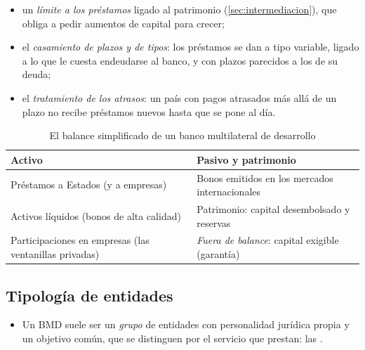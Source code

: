 \documentclass[11pt]{article}
\begin{document}
\begin{itemize}
  \begin{itemize}
  \item un \emph{límite a los préstamos} ligado al patrimonio (\ref{sec:intermediacion}), que obliga a pedir aumentos de capital para crecer;
  \item el \emph{casamiento de plazos y de tipos}: los préstamos se dan a tipo variable, ligado a lo que le cuesta endeudarse al banco, y con plazos parecidos a los de su deuda;
  \item el \emph{tratamiento de los atrasos}: un país con pagos atrasados más allá de un plazo no recibe préstamos nuevos hasta que se pone al día.
  \end{itemize}
\end{itemize}

\begin{table}[H]
\centering
\caption{El balance simplificado de un banco multilateral de desarrollo}\label{tab:balance}
\small
\begin{tabular}{>{\raggedright\arraybackslash}m{6.6cm}>{\raggedright\arraybackslash}m{6.6cm}}
\toprule
\rowcolor{tceeazulpalido} Activo & Pasivo y patrimonio \\
\midrule
Préstamos a Estados (y a empresas) & Bonos emitidos en los mercados internacionales \\
Activos líquidos (bonos de alta calidad) & Patrimonio: capital desembolsado y reservas \\
Participaciones en empresas (las ventanillas privadas) & \emph{Fuera de balance}: capital exigible (garantía) \\
\bottomrule
\end{tabular}
\end{table}

\subsection{Tipología de entidades}\label{sec:tipologia}

\begin{itemize}
\item Un BMD suele ser un \emph{grupo} de entidades con personalidad jurídica propia y un objetivo común, que se distinguen por el servicio que prestan: las .
\end{itemize}
\end{document}
